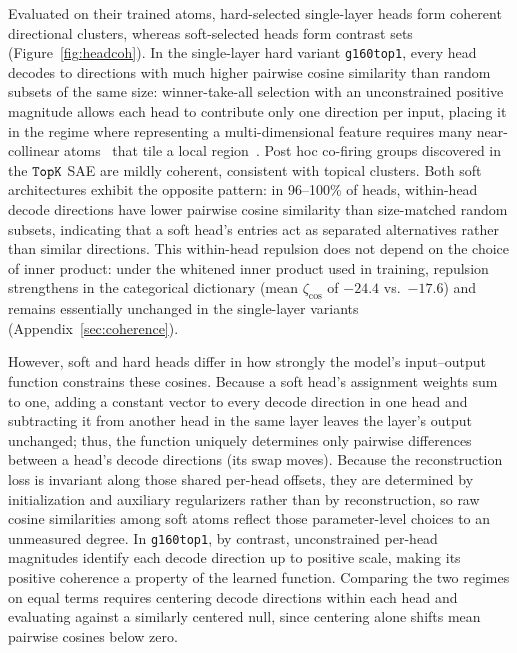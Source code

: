 Evaluated on their trained atoms, hard-selected single-layer heads form
coherent directional clusters, whereas soft-selected heads form contrast
sets (Figure~\ref{fig:headcoh}). In the single-layer hard variant
\texttt{g160top1}, every head decodes to directions with much higher
pairwise cosine similarity than random subsets of the same size:
winner-take-all selection with an unconstrained positive magnitude allows
each head to contribute only one direction per input, placing it in the
regime where representing a multi-dimensional feature requires many
near-collinear atoms~\cite{dalili2026} that tile a local
region~\cite{bhalla2026manifolds,fel2026structuring}. Post hoc co-firing
groups discovered in the $\mathop{\mathtt{TopK}}\limits$ SAE are mildly coherent, consistent with
topical clusters. Both soft architectures exhibit the opposite pattern: in
96--100\% of heads, within-head decode directions have lower pairwise cosine
similarity than size-matched random subsets, indicating that a soft head's
entries act as separated alternatives rather than similar directions. This
within-head repulsion does not depend on the choice of inner product: under
the whitened inner product used in training, repulsion strengthens in the
categorical dictionary (mean $\zeta_{\cos}$ of $-24.4$ vs.\ $-17.6$) and
remains essentially unchanged in the single-layer variants
(Appendix~\ref{sec:coherence}).

However, soft and hard heads differ in how strongly the model's input--output
function constrains these cosines. Because a soft head's assignment weights
sum to one, adding a constant vector to every decode direction in one head
and subtracting it from another head in the same layer leaves the layer's
output unchanged; thus, the function uniquely determines only pairwise
differences between a head's decode directions (its swap moves). Because the
reconstruction loss is invariant along those shared per-head offsets, they
are determined by initialization and auxiliary regularizers rather than by
reconstruction, so raw cosine similarities among soft atoms reflect those
parameter-level choices to an unmeasured degree. In \texttt{g160top1}, by
contrast, unconstrained per-head magnitudes identify each decode direction
up to positive scale, making its positive coherence a property of the
learned function. Comparing the two regimes on equal terms requires
centering decode directions within each head and evaluating against a
similarly centered null, since centering alone shifts mean pairwise cosines
below zero.

